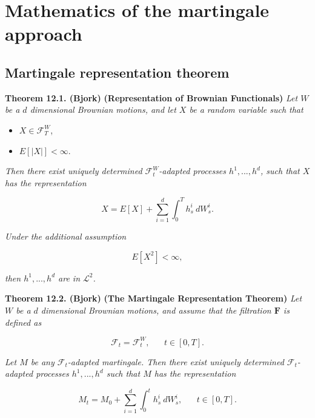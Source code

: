 \documentclass[
]{book}
\providecommand{\tightlist}{%
  \setlength{\itemsep}{0pt}\setlength{\parskip}{0pt}}
\begin{document}
\newpage

\hypertarget{mathematics-of-the-martingale-approach}{%
\section{Mathematics of the martingale approach}\label{mathematics-of-the-martingale-approach}}

\hypertarget{martingale-representation-theorem}{%
\subsection{Martingale representation theorem}\label{martingale-representation-theorem}}

\textbf{Theorem 12.1. (Bjork)} \textbf{(Representation of Brownian Functionals)} \emph{Let \(W\) be a \(d\) dimensional Brownian motions, and let \(X\) be a random variable such that}

\begin{itemize}
\tightlist
\item
  \(X\in\mathcal{F}^W_T\),
\item
  \(E[\vert X\vert]<\infty\).
\end{itemize}

\emph{Then there exist uniquely determined \(\mathcal{F}^W_t\)-adapted processes \(h^1,...,h^d\), such that \(X\) has the representation}

\[
X=E[X]+\sum_{i=1}^d\int_0^Th^i_s\ dW_s^i.\tag{12.2}
\]

\emph{Under the additional assumption}

\[
E[X^2]<\infty,
\]

\emph{then \(h^1,...,h^d\) are in \(\mathcal{L}^2\).}

\textbf{Theorem 12.2. (Bjork)} \textbf{(The Martingale Representation Theorem)} \emph{Let \(W\) be a \(d\) dimensional Brownian motions, and assume that the filtration \(\mathbf{F}\) is defined as}

\[
\mathcal{F}_t=\mathcal{F}^W_t,\hspace{20pt}t\in[0,T].
\]

\emph{Let \(M\) be any \(\mathcal{F}_t\)-adapted martingale. Then there exist uniquely determined \(\mathcal{F}_t\)-adapted processes \(h^1,...,h^d\) such that \(M\) has the representation}

\[
M_t=M_0+\sum_{i=1}^d\int_0^t h_s^i\ dW_s^i,\hspace{20pt}t\in[0,T].\tag{12.9}
\]
\end{document}
